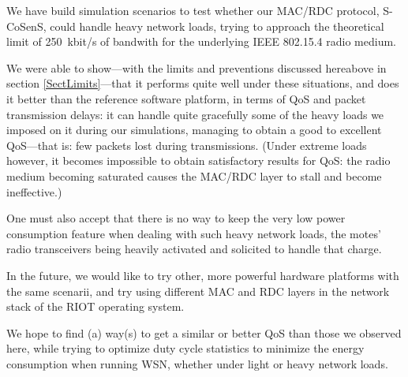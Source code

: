 \documentclass[a4paper,twoside]{article}
\begin{document}
We have build simulation scenarios to test whether our MAC/RDC protocol,
S-CoSenS, could handle heavy network loads, trying to approach the
theoretical limit of 250~kbit/s of bandwith for the underlying
IEEE 802.15.4 radio medium.

We were able to show---with the limits and preventions discussed hereabove
in section \ref{SectLimits}---that it performs quite well under these
situations, and does it better than the reference software platform, in terms
of QoS and packet transmission delays: it can handle quite gracefully some of
the heavy loads we imposed on it during our simulations, managing to obtain
a good to excellent QoS---that is: few packets lost during transmissions.
(Under extreme loads however, it becomes impossible to obtain satisfactory
results for QoS: the radio medium becoming saturated causes the MAC/RDC
layer to stall and become ineffective.)

One must also accept that there is no way to keep the very low power
consumption feature when dealing with such heavy network loads, the
motes' radio transceivers being heavily activated and solicited to
handle that charge.

\bigskip

In the future, we would like to try other, more powerful hardware platforms
with the same scenarii, and try using different MAC and RDC layers in
the network stack of the RIOT operating system.

We hope to find (a) way(s) to get a similar or better QoS than those
we observed here, while trying to optimize duty cycle statistics
to minimize the energy consumption when running WSN, whether under
light or heavy network loads.




\vfill

{\small
}
\end{document}
